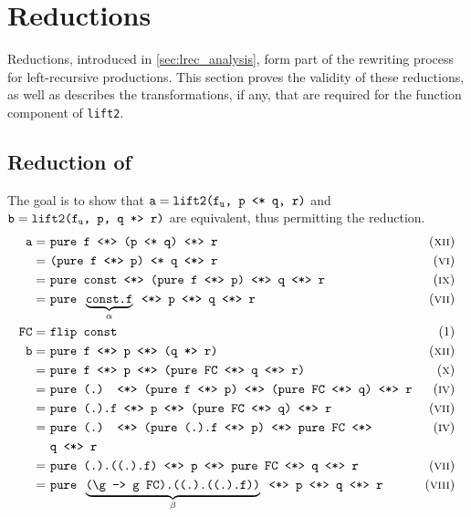 \section{Reductions}
\label{sec:sound_reductions}

Reductions, introduced in \autoref{sec:lrec_analysis}, form part of the rewriting process for left-recursive productions.
This section proves the validity of these reductions, as well as describes the transformations, if any, that are required for the function component of \texttt{lift2}.

\subsection{Reduction of \texttt{\apl}}
\label{ssec:reduce_discard}
The goal is to show that $\texttt{a} = \texttt{lift2(f}_\texttt{u}\texttt{, p \apl q, r)}$ and $\texttt{b} = \texttt{lift2(f}_\texttt{u}\texttt{, p, q \apr r)}$ are equivalent, thus permitting the reduction.
\begin{align*}
    \texttt{a} =\ & \texttt{pure f \ap (p \apl q) \ap r} & \equi[12] \\
    =\ & \texttt{(pure f \ap p) \apl q \ap r} & \equi[6] \\
    =\ & \texttt{pure const \ap (pure f \ap p) \ap q \ap r} & \equi[9] \\
    =\ & \texttt{pure }\underbrace{\texttt{const.f}}_{\alpha}\texttt{ \ap p \ap q \ap r} & \equi[7] \\
    \texttt{FC} =\ & \texttt{flip const} & \text{(1)} \\
    \texttt{b} =\ & \texttt{pure f \ap p \ap (q \apr r)} & \equi[12] \\
    =\ & \texttt{pure f \ap p \ap (pure FC \ap q \ap r)} & \equi[10] \\
    =\ & \texttt{pure (.) \ap (pure f \ap p) \ap (pure FC \ap q) \ap r} & \equi[4] \\
    =\ & \texttt{pure (.).f \ap p \ap (pure FC \ap q) \ap r} & \equi[7] \\
    =\ & \texttt{pure (.) \ap (pure (.).f \ap p) \ap pure FC \ap} & \equi[4] \\
    & \texttt{q \ap r} \\
    =\ & \texttt{pure (.).((.).f) \ap p \ap pure FC \ap q \ap r} & \equi[7] \\
    =\ & \texttt{pure }\underbrace{\texttt{(\textbackslash g -> g FC).((.).((.).f))}}_{\beta}\texttt{ \ap p \ap q \ap r} & \equi[8]
\end{align*}

